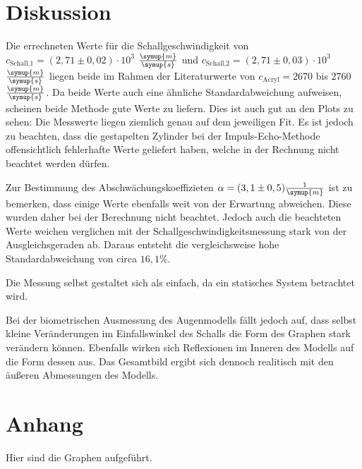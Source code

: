 \section{Diskussion}
\label{sec:Diskussion}


Die errechneten Werte für die Schallgeschwindigkeit von $c_\text{Schall,1} = (2,71 \pm 0,02) \cdot 10^{3}$ $\frac{\symup{m}}{\symup{s}}$ und $c_\text{Schall,2} = (2,71 \pm 0,03) \cdot 10^{3}$ $\frac{\symup{m}}{\symup{s}}$
liegen beide im Rahmen der Literaturwerte von $c_\text{Acryl} = 2670$ bis $2760$ $\frac{\symup{m}}{\symup{s}}$\cite{acryl}.
Da beide Werte auch eine ähnliche Standardabweichung aufweisen, scheinen beide Methode gute Werte zu liefern. Dies ist auch gut an den Plots zu sehen:
Die Messwerte liegen ziemlich genau auf dem jeweiligen Fit.
Es ist jedoch zu beachten, dass die gestapelten Zylinder bei der Impuls-Echo-Methode offensichtlich fehlerhafte Werte geliefert haben, welche in der Rechnung nicht beachtet werden dürfen.

Zur Bestimmung des Abschwächungskoeffizieten $\alpha = (3,1 \pm 0,5) \frac{1}{\symup{m}}$ ist zu bemerken, dass einige Werte ebenfalls weit von der Erwartung abweichen. Diese wurden daher bei der Berechnung nicht beachtet.
Jedoch auch die beachteten Werte weichen verglichen mit der Schallgeschwindigkeitsmessung stark von der Ausgleichsgeraden ab.
Daraus entsteht die vergleichsweise hohe Standardabweichung von circa $16,1 \%$.

Die Messung selbst gestaltet sich als einfach, da ein statisches System betrachtet wird.

Bei der biometrischen Ausmessung des Augenmodells fällt jedoch auf, dass selbst kleine Veränderungen im Einfallswinkel des Schalls die Form des Graphen stark verändern können.
Ebenfalls wirken sich Reflexionen im Inneren des Modells auf die Form dessen aus. Das Gesamtbild ergibt sich dennoch realitisch mit den äußeren Abmessungen des Modells.



\section{Anhang}

Hier sind die Graphen aufgeführt.

